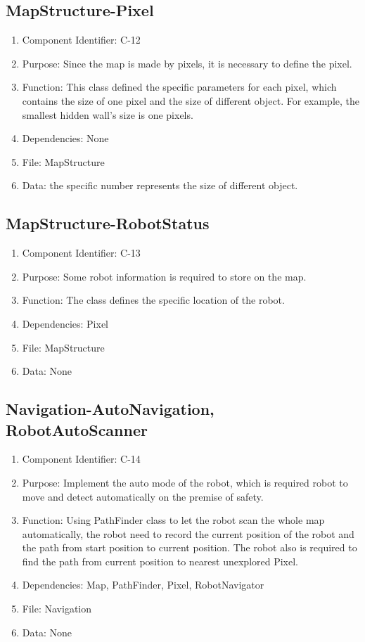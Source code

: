 \documentclass[11pt, a4paper]{report}
\begin{document}
\subsection{MapStructure-Pixel}
\begin{enumerate}
\item Component Identifier: C-12
\item Purpose: Since the map is made by pixels, it is necessary to define the pixel.
\item Function: This class defined the specific parameters for each pixel, which contains the size of one pixel and the size of different object. For example, the smallest hidden wall's size is one pixels.
\item Dependencies: None
\item File: MapStructure
\item Data: the specific number represents the size of different object.
\end{enumerate}

\subsection{MapStructure-RobotStatus}
\begin{enumerate}
\item Component Identifier: C-13
\item Purpose: Some robot information is required to store on the map.
\item Function: The class defines the specific location of the robot.
\item Dependencies: Pixel
\item File: MapStructure
\item Data: None
\end{enumerate}

\subsection{Navigation-AutoNavigation, RobotAutoScanner}
\begin{enumerate}
\item Component Identifier: C-14
\item Purpose: Implement the auto mode of the robot, which is required robot to move and detect automatically on the premise of safety.
\item Function: Using PathFinder class to let the robot scan the whole map automatically, the robot need to record the current position of the robot and the path from start position to current position. The robot also is required to find the path from current position to nearest unexplored Pixel.
\item Dependencies: Map, PathFinder, Pixel, RobotNavigator
\item File: Navigation
\item Data: None
\end{enumerate}
\end{document}

